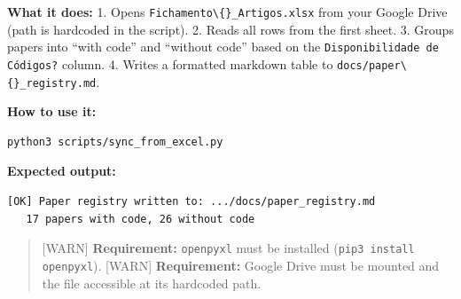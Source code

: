 \textbf{What it does:} 1. Opens
\texttt{Fichamento\textbackslash\{\}\_Artigos.xlsx} from your Google
Drive (path is hardcoded in the script). 2. Reads all rows from the
first sheet. 3. Groups papers into ``with code'' and ``without code''
based on the \texttt{Disponibilidade de Códigos?}
column. 4. Writes a formatted markdown table to
\texttt{docs/paper\textbackslash\{\}\_registry.md}.

\textbf{How to use it:}

\begin{verbatim}
python3 scripts/sync_from_excel.py
\end{verbatim}

\textbf{Expected output:}

\begin{verbatim}
[OK] Paper registry written to: .../docs/paper_registry.md
   17 papers with code, 26 without code
\end{verbatim}

\begin{quote}
\small {[}WARN{]} \textbf{Requirement:} \texttt{openpyxl} must
be installed (\texttt{pip3 install openpyxl}).
{[}WARN{]} \textbf{Requirement:} Google Drive must be mounted and the
file accessible at its hardcoded path.
\end{quote}
